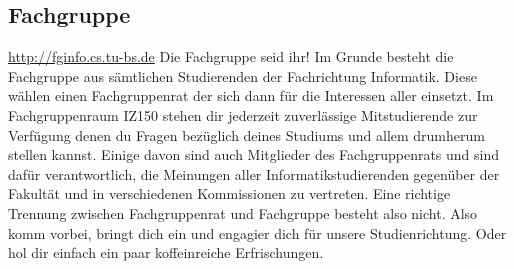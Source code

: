 \subsection{Fachgruppe}
	\label{fachgruppe}
	\url{http://fginfo.cs.tu-bs.de}
	Die Fachgruppe seid ihr! Im Grunde besteht die Fachgruppe aus sämtlichen Studierenden der Fachrichtung Informatik. Diese wählen einen Fachgruppenrat der sich dann für die Interessen aller einsetzt. 
	Im Fachgruppenraum IZ150 stehen dir jederzeit zuverlässige Mitstudierende zur Verfügung denen du Fragen bezüglich deines Studiums und allem drumherum stellen kannst. Einige davon sind auch Mitglieder des Fachgruppenrats und sind dafür verantwortlich, die Meinungen aller Informatikstudierenden gegenüber der Fakultät und in verschiedenen Kommissionen zu vertreten. Eine richtige Trennung zwischen Fachgruppenrat und Fachgruppe besteht also nicht. Also komm vorbei, bringt dich ein und engagier dich für unsere Studienrichtung. Oder hol dir einfach ein paar koffeinreiche Erfrischungen. 
